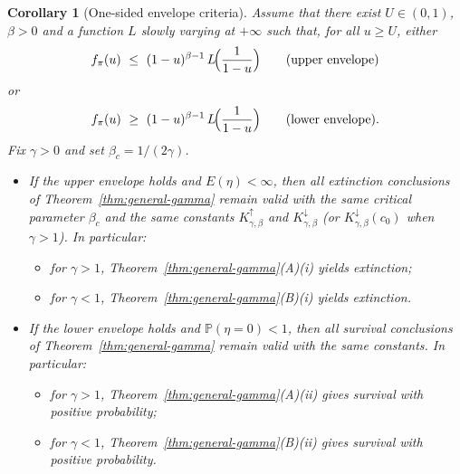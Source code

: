\documentclass[preprint]{imsart}
\newcommand{\PP}{\mathbb{P}}
\newcommand{\1}{\mathbf{1}}
\theoremstyle{plain}
\newtheorem{corollary}[theorem]{Corollary}
\theoremstyle{definition}
\begin{document}
\begin{corollary}[One-sided envelope criteria]\label{cor:general-gamma-envelope}
Assume that there exist $U\in(0,1)$, $\beta>0$ and a function $L$ slowly varying at $+\infty$ such that, for all $u\ge U$,
either
\[
  f_\pi(u)\ \le\ (1-u)^{\beta-1}\,L\!\Big(\frac{1}{1-u}\Big)
  \qquad\textup{(upper envelope)}
\]
or
\[
  f_\pi(u)\ \ge\ (1-u)^{\beta-1}\,L\!\Big(\frac{1}{1-u}\Big)
  \qquad\textup{(lower envelope)}.
\]
Fix $\gamma>0$ and set $\beta_c=1/(2\gamma)$.

\begin{itemize}
\item If the \emph{upper} envelope holds and $E(\eta)<\infty$, then all extinction conclusions of
Theorem~\ref{thm:general-gamma} remain valid with the same critical parameter $\beta_c$ and the same constants
$K^{\uparrow}_{\gamma,\beta}$ and $K^{\downarrow}_{\gamma,\beta}$ (or $K^{\downarrow}_{\gamma,\beta}(c_0)$ when $\gamma>1$).
In particular:
  \begin{itemize}
  \item for $\gamma>1$, Theorem~\ref{thm:general-gamma}\textup{(A)(i)} yields extinction;
  \item for $\gamma<1$, Theorem~\ref{thm:general-gamma}\textup{(B)(i)} yields extinction.
  \end{itemize}

\item If the \emph{lower} envelope holds and $\PP(\eta=0)<1$, then all survival conclusions of
Theorem~\ref{thm:general-gamma} remain valid with the same constants. In particular:
  \begin{itemize}
  \item for $\gamma>1$, Theorem~\ref{thm:general-gamma}\textup{(A)(ii)} gives survival with positive probability;
  \item for $\gamma<1$, Theorem~\ref{thm:general-gamma}\textup{(B)(ii)} gives survival with positive probability.
  \end{itemize}
\end{itemize}
\end{corollary}


\end{document}
